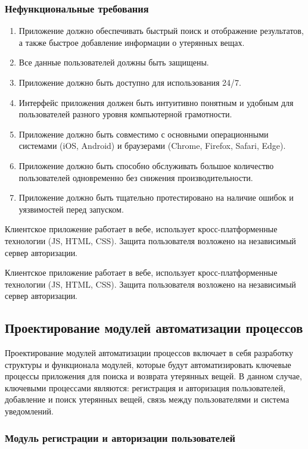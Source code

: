 \subsubsection{Нефункциональные требования}

\begin{enumerate}
	\item Приложение должно обеспечивать быстрый поиск и отображение результатов, а также быстрое добавление информации о утерянных вещах.
	\item Все данные пользователей должны быть защищены.
	\item Приложение должно быть доступно для использования 24/7.
	\item Интерфейс приложения должен быть интуитивно понятным и удобным для пользователей разного уровня компьютерной грамотности.
	\item Приложение должно быть совместимо с основными операционными системами (iOS, Android) и браузерами (Chrome, Firefox, Safari, Edge).
	\item Приложение должно быть способно обслуживать большое количество пользователей одновременно без снижения производительности.
	\item Приложение должно быть тщательно протестировано на наличие ошибок и уязвимостей перед запуском.
\end{enumerate}

Клиентское приложение работает в вебе, использует кросс-платформенные технологии (JS, HTML, CSS). Защита пользователя возложено на независимый сервер авторизации.

Клиентское приложение работает в вебе, использует кросс-платформенные технологии (JS, HTML, CSS). Защита пользователя возложено на независимый сервер авторизации.

\subsection{Проектирование модулей автоматизации процессов}

Проектирование модулей автоматизации процессов включает в себя разработку структуры и функционала модулей, которые будут автоматизировать ключевые процессы приложения для поиска и возврата утерянных вещей. В данном случае, ключевыми процессами являются: регистрация и авторизация пользователей, добавление и поиск утерянных вещей, связь между пользователями и система уведомлений.

\subsubsection{Модуль регистрации и авторизации пользователей}

